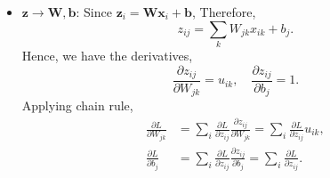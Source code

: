 \documentclass[11pt]{article}
\def\arr{\rightarrow}
\newcommand{\bbf}{\mathbf{b}}
\newcommand{\xbf}{\mathbf{x}}
\newcommand{\zbf}{\mathbf{z}}
\newcommand{\Wbf}{\mathbf{W}}
\begin{document}
\begin{enumerate}
\begin{enumerate}[(a)]
\begin{itemize}
\item $\zbf \arr \Wbf,\bbf$:  Since $\zbf_i = \Wbf\xbf_i + \bbf$, 
Therefore,
\[
    z_{ij} = \sum_k W_{jk}x_{ik} + b_j.
\]
Hence, we have the derivatives,
\[
    \frac{\partial z_{ij}}{\partial W_{jk}} = u_{ik}, \quad
    \frac{\partial z_{ij}}{\partial b_{j}} = 1.
\]
Applying chain rule,
\begin{align*}
    \frac{\partial L}{\partial W_{jk}} &= 
        \sum_i \frac{\partial L}{\partial z_{ij}}\frac{\partial z_{ij}}{\partial W_{jk}} 
        = \sum_i \frac{\partial L}{\partial z_{ij}}u_{ik}, \\
    \frac{\partial L}{\partial b_{j}} &=
        \sum_i \frac{\partial L}{\partial z_{ij}}\frac{\partial z_{ij}}{\partial b_{j}}
        = \sum_i \frac{\partial L}{\partial z_{ij}}. 
\end{align*}

\end{itemize}

\end{enumerate}



\end{enumerate}
\end{document}

